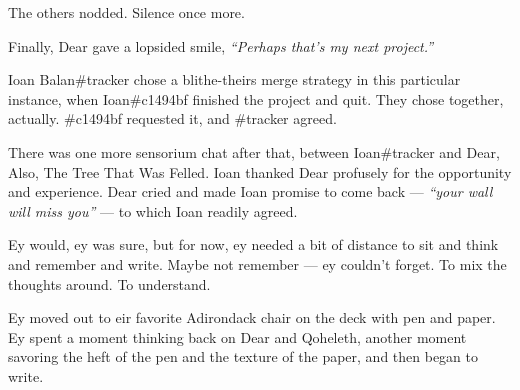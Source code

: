 The others nodded. Silence once more.

Finally, Dear gave a lopsided smile, \emph{``Perhaps that's my next project.''}

\secdiv{}

\noindent Ioan Balan\#tracker chose a blithe-theirs merge strategy in this particular instance, when Ioan\#c1494bf finished the project and quit. They chose together, actually. \#c1494bf requested it, and \#tracker agreed.

There was one more sensorium chat after that, between Ioan\#tracker and Dear, Also, The Tree That Was Felled. Ioan thanked Dear profusely for the opportunity and experience. Dear cried and made Ioan promise to come back --- \emph{``your wall will miss you''} --- to which Ioan readily agreed.

Ey would, ey was sure, but for now, ey needed a bit of distance to sit and think and remember and write. Maybe not remember --- ey couldn't forget. To mix the thoughts around. To understand.

Ey moved out to eir favorite Adirondack chair on the deck with pen and paper. Ey spent a moment thinking back on Dear and Qoheleth, another moment savoring the heft of the pen and the texture of the paper, and then began to write.
